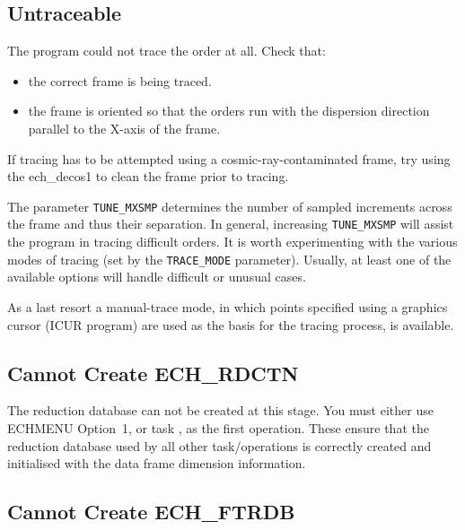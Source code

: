 \subsection{ Untraceable}

 The program could not trace the order at all.  Check that:

\begin{itemize}

\item the correct frame is being traced.

\item the frame is oriented so that the orders run with the dispersion
      direction parallel to the X-axis of the frame.

\end{itemize}

 If tracing has to be attempted using a cosmic-ray-con\-tami\-nated
 frame, try using the 
 {ech_decos1} to clean the frame prior to tracing.

 The parameter \verb+TUNE_MXSMP+ determines the number of sampled increments
 across the frame and thus their separation.  In general, increasing
 \verb+TUNE_MXSMP+ will assist the program in tracing difficult orders.
 It is worth experimenting with the various modes of tracing (set by
 the \verb+TRACE_MODE+ parameter).  Usually, at least one of the available
 options will handle difficult or unusual cases.

 As a last resort a manual-trace mode, in which points specified using
 a graphics cursor (ICUR program) are used as the basis for the tracing
 process, is available.


\subsection{ Cannot Create ECH\_RDCTN}

The reduction database can not be created at this stage. You must
either use ECHMENU Option~1, or task ,
as the first operation.
These ensure that the reduction database used by all
other task/operations is correctly created and initialised with the data
frame dimension information.

\subsection{ Cannot Create ECH\_FTRDB}

